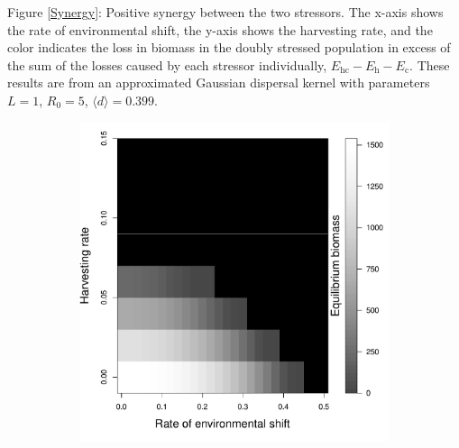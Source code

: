 \documentclass[12pt,english]{article}
\begin{document}
\pagebreak

Figure \ref{Synergy}: Positive synergy between the two stressors.  The x-axis shows the rate of environmental shift, the y-axis shows the harvesting rate, and the color indicates the loss in biomass in the doubly stressed population in excess of the sum of the losses caused by each stressor individually, $E_\text{hc}-E_\text{h}-E_\text{c}$.  These results are from an approximated Gaussian dispersal kernel with parameters $L=1$, $R_0=5$, $\langle d \rangle = 0.399$.

\pagebreak

\begin{figure}[htbp]

\begin{subfigure}{.33\textwidth}
\subcaption{}
\includegraphics[width=\textwidth]{plots/eqbiomass_sim.pdf}
\label{nomang}
\end{subfigure}
\begin{subfigure}{.33\textwidth}
\subcaption{}

\end{subfigure}
\end{figure}
\end{document}
